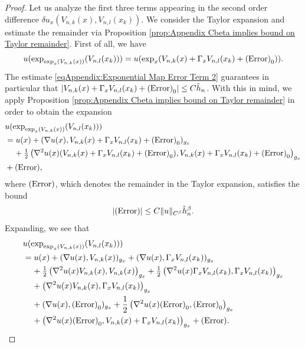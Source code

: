 \documentclass[11pt,reqno]{amsart}
\numberwithin{equation}{section}
\theoremstyle{plain}
\begin{document}
\begin{proof}
  
  Let us analyze the first three terms appearing in the second order difference $\delta u_{x}(V_{n,k}(x),V_{n,l}(x_k))$.  We consider the Taylor expansion and estimate the remainder via Proposition \ref{prop:Appendix Cbeta implies bound on Taylor remainder}. First of all, we have
  \begin{align*} 
    u(\exp_{\exp_x(V_{n,k}(x))}(V_{n,l}(x_k))) = u(\exp_{x}(V_{n,k}(x)+\Gamma_xV_{n,l}(x_k)+ \textnormal{(Error)}_0)).
  \end{align*}
  The estimate \eqref{eqAppendix:Exponential Map Error Term 2} guarantees in particular that $|V_{n,k}(x)+\Gamma_xV_{n,l}(x_k)+ \textnormal{(Error)}_0|\leq C\tilde h_n$. With this in mind, we apply Proposition \ref{prop:Appendix Cbeta implies bound on Taylor remainder} in order to obtain the expansion
  \begin{align*} 
    & u(\exp_{\exp_x(V_{n,k}(x))}(V_{n,l}(x_k)))\\
    & = u(x)+ (\nabla u(x),V_{n,k}(x)+\Gamma_xV_{n,l}(x_k)+ \textnormal{(Error)}_0)_{g_x}\\
    & \;\;\;\; + \tfrac{1}{2} \left (\nabla^2u(x)( V_{n,k}(x)+\Gamma_xV_{n,l}(x_k)+ \textnormal{(Error)}_0) , V_{n,k}(x)+\Gamma_xV_{n,l}(x_k)+ \textnormal{(Error)}_0 \right )_{g_x}\\
    & + \textnormal{(Error)},	
  \end{align*}
  where $\textnormal{(Error)}$, which denotes the remainder in the Taylor expansion, satisfies the bound 
  \begin{align*}
    | \textnormal{(Error)}| \leq C\|u\|_{C^\beta}\tilde h_n^\beta.  
  \end{align*}	  
 Expanding, we see that
  \begin{align*} 
    & u(\exp_{\exp_x(V_{n,k}(x))}(V_{n,l}(x_k)))\\
    & = u(x)+ (\nabla u(x),V_{n,k}(x))_{g_x}+(\nabla u(x),\Gamma_xV_{n,l}(x_k))_{g_x}\\
    & \;\;\;\; + \tfrac{1}{2} \left (\nabla^2u(x) V_{n,k}(x),V_{n,k}(x)\right )_{g_x}+\tfrac{1}{2} \left (\nabla^2u(x)\Gamma_xV_{n,l}(x_k),\Gamma_xV_{n,l}(x_k)\right )_{g_x}\\
    & \;\;\;\; + \left (\nabla^2u(x) V_{n,k}(x),\Gamma_xV_{n,l}(x_k)\right )_{g_x}\\ 	
    & \;\;\;\;+(\nabla u(x),\textnormal{(Error)}_0)_{g_x}+\frac{1}{2}\left (\nabla^2u(x)\textnormal{(Error)}_0,\textnormal{(Error)}_0\right )_{g_x}\\
    & \;\;\;\;+\left (\nabla^2u(x)\textnormal{(Error)}_0,V_{n,k}(x)+\Gamma_xV_{n,l}(x_k)\right )_{g_x}+ \textnormal{(Error)}.	

\end{align*}
\end{proof}
\end{document}
